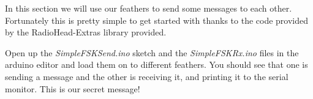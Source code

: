 In this section we will use our feathers to send some messages to each other. Fortunately this is pretty simple to get started with thanks to the code provided by the RadioHead-Extras library provided.

Open up the \textit{SimpleFSKSend.ino} sketch and the \textit{SimpleFSKRx.ino} files in the arduino editor and load them on to different feathers. You should see that one is sending a message and the other is receiving it, and printing it to the serial monitor. This is our secret message!
